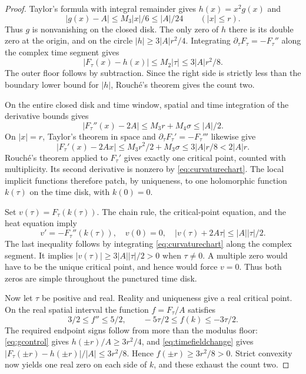 \begin{proof}
Taylor's formula with integral remainder gives $h(x)=x^2g(x)$ and
\begin{equation}\label{eq:gcontrol}
 |g(x)-A|\leq M_3|x|/6\leq|A|/24
                                         \qquad(|x|\leq r).
\end{equation}
Thus $g$ is nonvanishing on the closed disk. The only zero of $h$
there is its double zero at the origin, and on the circle
$|h|\geq3|A|r^2/4$. Integrating
$\partial_\tau F_\tau=-F_\tau''$ along the complex time segment gives
\begin{equation}\label{eq:timefieldchange}
 |F_\tau(x)-h(x)|\leq M_2|\tau|\leq3|A|r^2/8.
\end{equation}
The outer floor follows by subtraction. Since the right side is
strictly less than the boundary lower bound for $|h|$, Rouch\'e's
theorem gives the count two.

On the entire closed disk and time window, spatial and time integration
of the derivative bounds gives
\begin{equation}\label{eq:curvaturechart}
 |F_\tau''(x)-2A|\leq M_3r+M_4\sigma\leq|A|/2.
\end{equation}
On $|x|=r$, Taylor's theorem in space and
$\partial_\tau F_\tau'=-F_\tau'''$ likewise give
\[
 |F_\tau'(x)-2Ax|\leq M_3r^2/2+M_3\sigma
                       \leq3|A|r/8<2|A|r.
\]
Rouch\'e's theorem applied to $F_\tau'$ gives exactly one critical
point, counted with multiplicity. Its second derivative is nonzero by
\eqref{eq:curvaturechart}. The local implicit functions therefore
patch, by uniqueness, to one holomorphic function $k(\tau)$ on the
time disk, with $k(0)=0$.

Set $v(\tau)=F_\tau(k(\tau))$. The chain rule, the critical-point
equation, and the heat equation imply
\begin{equation}\label{eq:criticalvalue}
 v'=-F_\tau''(k(\tau)),\quad v(0)=0,\quad
 |v(\tau)+2A\tau|\leq|A||\tau|/2.
\end{equation}
The last inequality follows by integrating
\eqref{eq:curvaturechart} along the complex segment. It implies
$|v(\tau)|\geq3|A||\tau|/2>0$ when $\tau\ne0$. A multiple zero
would have to be the unique critical point, and hence would force
$v=0$. Thus both zeros are simple throughout the punctured time disk.

Now let $\tau$ be positive and real. Reality and uniqueness give a real
critical point. On the real spatial interval the function $f=F_\tau/A$
satisfies
\begin{equation}\label{eq:realconvexity}
 3/2\leq f''\leq5/2,\qquad
 -5\tau/2\leq f(k)\leq-3\tau/2.
\end{equation}
The required endpoint signs follow from more than the modulus floor:
\eqref{eq:gcontrol} gives $h(\pm r)/A\geq3r^2/4$, and
\eqref{eq:timefieldchange} gives
$|F_\tau(\pm r)-h(\pm r)|/|A|\leq3r^2/8$.
Hence $f(\pm r)\geq3r^2/8>0$. Strict convexity now yields one
real zero on each side of $k$, and these exhaust the count two.


\end{proof}
